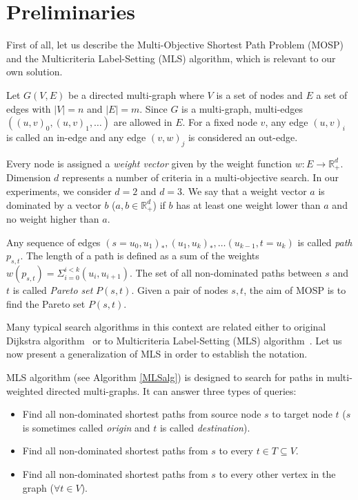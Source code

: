 
\section{Preliminaries}
\label{secPreliminaries}

First of all, let us describe the Multi-Objective Shortest Path Problem (MOSP) and the Multicriteria Label-Setting (MLS) algorithm, which is relevant to our own solution.

Let $G(V,E)$ be a directed multi-graph where $V$ is a set of nodes and $E$ a set
of edges with $|V| = n$ and $|E| = m$. Since $G$ is a multi-graph, multi-edges
$((u,v)_0,(u,v)_1,\dots)$ are allowed in $E$. For a fixed node $v$, any edge $(u,v)_i$ is called an in-edge and any edge $(v,w)_j$ is considered an out-edge.

Every node is assigned a \emph{weight vector} given by the weight function $w: E \rightarrow \mathbb{R}_+^d$. Dimension $d$ represents a number of criteria in a multi-objective search. 
In our experiments, we consider $d=2$ and $d=3$.
We say that a weight vector $a$ is dominated by a vector $b$ ($a,b \in \mathbb{R}_+^d$) if
$b$ has at least one weight lower than $a$ and no weight higher than $a$. 

Any sequence of edges $(s \! = \! u_0,u_1)_*,(u_1,u_k)_*,\dots(u_{k-1},t \! = \! u_k)$ is called
\emph{path} $p_{s,t}$. The length of a path is defined as a sum of the weights 
$w(p_{s,t}) = \Sigma_{i=0}^{i<k} (u_i,u_{i+1})$. The set of all non-dominated paths between $s$ and $t$ is called {\em Pareto set}
$P(s,t)$. Given a pair of nodes $s,t$, the aim of MOSP is to find the Pareto set $P(s,t)$.

\vskip 5mm

Many typical search algorithms in this context are related either to original Dijkstra algorithm~\cite{dijkstra1959note} or to Multicriteria Label-Setting (MLS) algorithm~\cite{martins1984multicriteria}. Let us now present a generalization of MLS in order to establish the notation.

MLS algorithm (see Algorithm \ref{MLSalg}) is designed to search for paths in multi-weighted directed multi-graphs. It can answer three types of queries:
\begin{itemize}
\item Find all non-dominated shortest paths from source node $s$ to target node $t$ ($s$ is sometimes called {\em origin} and $t$ is called {\em destination}).
\item Find all non-dominated shortest paths from $s$ to every $t \in T \subseteq V$.
\item Find all non-dominated shortest paths from $s$ to every other vertex in the graph ($\forall t \in V$).
\end{itemize}

